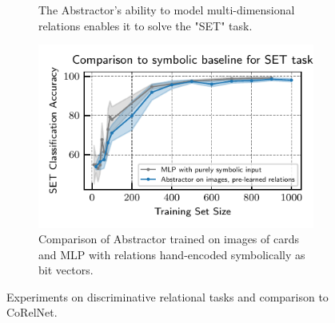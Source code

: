 \begin{figure}[t]
\begin{subfigure}[t]{0.40\textwidth}
        \caption{The Abstractor's ability to model multi-dimensional relations enables it to solve the "SET" task.}\label{fig:exp_set_classification}
    \end{subfigure}
    \centering
    \begin{subfigure}[t]{0.40\textwidth}
        \centering
        \includegraphics[scale=.95]{figures/experiments/set_symbolic_vs_abstractor.pdf}
        \caption{Comparison of Abstractor trained on images of cards and MLP with relations hand-encoded symbolically as bit vectors.}%
        \label{fig:exp_set_symbolic}
    \end{subfigure}
    \caption{Experiments on discriminative relational tasks and comparison to CoRelNet.}
\end{figure}
